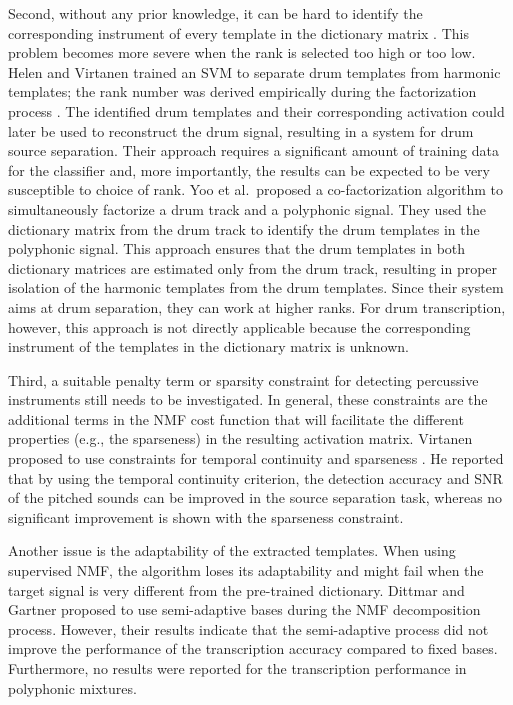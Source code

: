 \documentclass{article}
\begin{document}
Second, without any prior knowledge, it can be hard to identify the corresponding instrument of every template in the dictionary matrix \cite{yoo_nonnegative_2010}. This problem becomes more severe when the rank is selected too high or too low. Helen and Virtanen trained an SVM to separate drum templates from harmonic templates; the rank number was derived empirically during the factorization process \cite{helen_separation_2005}. The identified drum templates and their corresponding activation could later be used to reconstruct the drum signal, resulting in a system for drum source separation. Their approach requires a significant amount of training data for the classifier and, more importantly, the results can be expected to be very susceptible to choice of rank. Yoo et al.\ proposed a co-factorization algorithm \cite{yoo_nonnegative_2010} to simultaneously factorize a drum track and a polyphonic signal. They used the dictionary matrix from the drum track to identify the drum templates in the polyphonic signal. This approach ensures that the drum templates in both dictionary matrices are estimated only from the drum track, resulting in proper isolation of the harmonic templates from the drum templates. Since their system aims at drum separation, they can work at higher ranks. For drum transcription, however, this approach is not directly applicable because the corresponding instrument of the templates in the dictionary matrix is unknown.  

Third, a suitable penalty term or sparsity constraint for detecting percussive instruments still needs to be investigated. In general, these constraints are the additional terms in the NMF cost function that will facilitate the different properties (e.g., the sparseness) in the resulting activation matrix. Virtanen proposed to use constraints for temporal continuity and sparseness \cite{virtanen_ssnmf_2007}. He reported that by using the temporal continuity criterion, the detection accuracy and SNR of the pitched sounds can be improved in the source separation task, whereas no significant improvement is shown with the sparseness constraint. 

Another issue is the adaptability of the extracted templates. When using supervised NMF, the algorithm loses its adaptability and might fail when the target signal is very different from the pre-trained dictionary. Dittmar and Gartner proposed to use semi-adaptive bases during the NMF decomposition process\cite{Dittmar2014}. However, their results indicate that the semi-adaptive process did not improve the performance of the transcription accuracy compared to fixed bases. Furthermore, no results were reported for the transcription performance in polyphonic mixtures. 
\end{document}
